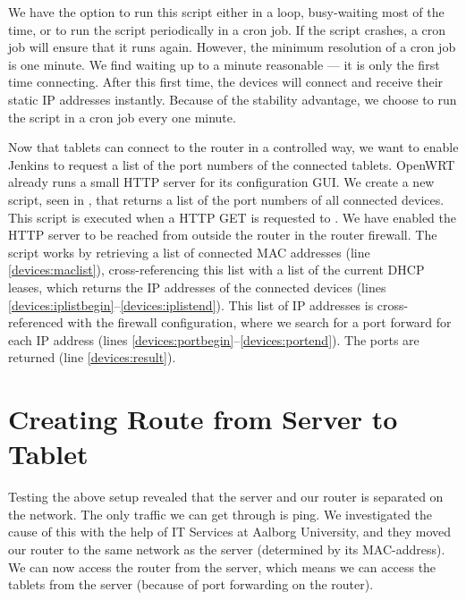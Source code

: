 We have the option to run this script either in a loop, busy-waiting most of the time, or to run the script periodically in a cron job. If the script crashes, a cron job will ensure that it runs again. However, the minimum resolution of a cron job is one minute. We find waiting up to a minute reasonable --- it is only the first time connecting. After this first time, the devices will connect and receive their static IP addresses instantly. Because of the stability advantage, we choose to run the script in a cron job every one minute.




Now that tablets can connect to the router in a controlled way, we want to enable Jenkins to request a list of the port numbers of the connected tablets. OpenWRT already runs a small HTTP server for its configuration GUI\@. We create a new script, seen in , that returns a list of the port numbers of all connected devices. This script is executed when a HTTP GET is requested to . We have enabled the HTTP server to be reached from outside the router in the router firewall. The script works by retrieving a list of connected MAC addresses (line \ref{devices:maclist}), cross-referencing this list with a list of the current DHCP leases, which returns the IP addresses of the connected devices (lines \ref{devices:iplistbegin}--\ref{devices:iplistend}). This list of IP addresses is cross-referenced with the firewall configuration, where we search for a port forward for each IP address (lines \ref{devices:portbegin}--\ref{devices:portend}). The ports are returned (line \ref{devices:result}).



\section{Creating Route from Server to Tablet}\label{sec:router_server_tablet}
Testing the above setup revealed that the server and our router is separated on the network. The only traffic we can get through is ping. We investigated the cause of this with the help of IT Services at Aalborg University, and they moved our router to the same network as the server (determined by its MAC-address). We can now access the router from the server, which means we can access the tablets from the server (because of port forwarding on the router).

